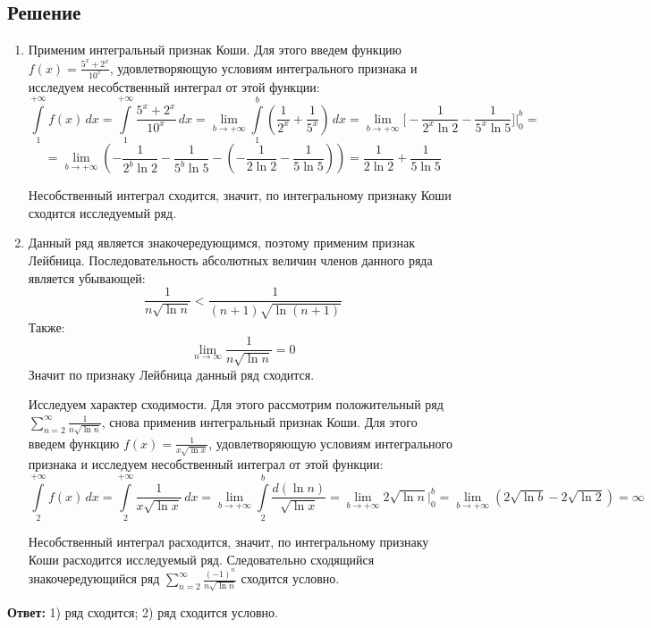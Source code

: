 \documentclass[12pt]{article}
\begin{document}
	\subsection*{Решение}
	\begin{enumerate}[wide, labelwidth=!, labelindent=0pt]
		\item Применим интегральный признак Коши. Для этого введем функцию $ f(x) = \frac{5^x + 2^x}{10^x} $, удовлетворяющую условиям интегрального признака и исследуем несобственный интеграл от этой функции:		
		$$ \int \limits_1^{+ \infty} f(x) \, dx = \int \limits_1^{+ \infty} \frac{5^x + 2^x}{10^x} \, dx = \lim_{b \to + \infty} \int \limits_1^b ( \frac{1}{2^x} + \frac{1}{5^x}) \, dx = \lim_{b \to + \infty} \Big[ - \frac{1}{ 2^x \ln{2} } - \frac{1}{ 5^x \ln{5} } \Big] \Big|_0^b = $$
		$$ = \lim_{b \to + \infty} ( - \frac{1}{ 2^b \ln{2} } - \frac{1}{ 5^b \ln{5} } - (- \frac{1}{ 2 \ln{2} } - \frac{1}{ 5 \ln{5} } ) )  =  \frac{1}{ 2 \ln{2} } + \frac{1}{ 5 \ln{5} }$$

		Несобственный интеграл сходится, значит, по интегральному признаку Коши сходится исследуемый ряд. 

		\item Данный ряд является знакочередующимся, поэтому применим признак Лейбница. Последовательность абсолютных величин членов данного ряда является убывающей:
		$$ \frac{1}{n\sqrt{\ln{n}}} < \frac{1}{(n+1)\sqrt{\ln{(n+1)}}} $$		
		Также:
		$$ \lim_{n \to \infty} \frac{1}{n\sqrt{\ln{n}}} = 0 $$
		Значит по признаку Лейбница данный ряд сходится.

		Исследуем характер сходимости. Для этого рассмотрим положительный ряд $ \sum_{n=2}^{\infty} \frac{1}{n\sqrt{\ln{n}}} $, снова применив интегральный признак Коши. Для этого введем функцию $ f(x) = \frac{1}{x\sqrt{\ln{x}}} $, удовлетворяющую условиям интегрального признака и исследуем несобственный интеграл от этой функции:
		$$ \int \limits_2^{+ \infty} f(x) \, dx = \int \limits_2^{+ \infty} \frac{1}{x\sqrt{\ln{x}}} \, dx = \lim_{b \to + \infty} \int \limits_2^b \frac{d(\ln{n})}{\sqrt{\ln{x}}} = \lim_{b \to + \infty} 2\sqrt{\ln{n}} \Big|_0^b = \lim_{b \to + \infty} ( 2\sqrt{\ln{b}} - 2\sqrt{\ln{2}} ) = \infty $$

		Несобственный интеграл расходится, значит, по интегральному признаку Коши расходится исследуемый ряд. Следовательно сходящийся знакочередующийся ряд $ \sum_{n=2}^{\infty} \frac{(-1)^n}{n\sqrt{\ln{n}}} $ сходится условно. 		
	\end{enumerate}

	\hspace{200pt}\textbf{Ответ:} 1) ряд сходится; 2) ряд сходится условно.
\end{document}
